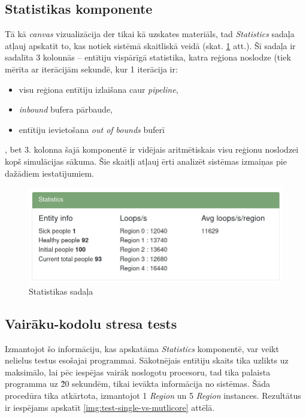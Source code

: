 \subsection{Statistikas komponente}

Tā kā \emph{canvas} vizualizācija der tikai kā uzskates materiāls, tad \emph{Statistics}
sadaļa atļauj apskatīt to, kas notiek sistēmā skaitliskā veidā (skat. \ref{img:statistics} att.).
Šī sadaļa ir sadalīta 3 kolonnās -- entītiju vispārīgā statistika, katra reģiona
noslodze (tiek mērīta ar iterācijām sekundē, kur 1 iterācija ir:

\begin{itemize}
    \item visu reģiona entītiju izlaišana caur \emph{pipeline},
    \item \emph{inbound} bufera pārbaude,
    \item entītiju ievietošana \emph{out of bounds} buferī
\end{itemize}

, bet 3. kolonna šajā komponentē ir vidējais aritmētiskais visu reģionu
noslodzei kopš simulācijas sākuma. Šie skaitļi atļauj ērti analizēt sistēmas
izmaiņas pie dažādiem iestatījumiem.

\begin{figure}[H]
	\centering
	\includegraphics[scale=0.5]{images/statistics.png}
	\caption{Statistikas sadaļa}
	\label{img:statistics}
\end{figure}

\subsection{Vairāku-kodolu stresa tests}

Izmantojot šo informāciju, kas apskatāma \emph{Statistics} komponentē, var veikt
nelielus testus esošajai programmai. Sākotnējais entītiju skaits tika uzlikts uz
maksimālo, lai pēc iespējas vairāk noslogotu procesoru, tad tika palaista programma
uz \~ 20 sekundēm, tikai ievākta informācija no sistēmas. Šāda procedūra tika
atkārtota, izmantojot 1 \emph{Region} un 5 \emph{Region} instances. Rezultātus
ir iespējams apskatīt \ref{img:test-single-vs-mutlicore} attēlā.

